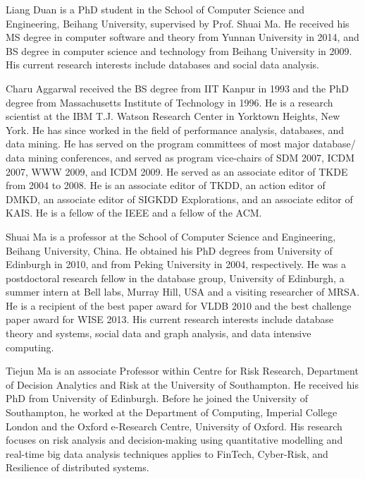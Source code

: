 \vspace{-8ex}
\begin{IEEEbiography}{Liang Duan} is a PhD student in the School of Computer Science and Engineering, Beihang University, supervised by Prof. Shuai Ma. He received his MS degree in computer software and theory from Yunnan University in 2014, and BS degree in computer science and technology from Beihang University in 2009. His current research interests include databases and social data analysis.
\end{IEEEbiography}
\vspace{-8ex}
\begin{IEEEbiography}{Charu Aggarwal} received the BS degree
from IIT Kanpur in 1993 and the PhD degree
from Massachusetts Institute of Technology in
1996. He is a research scientist at the IBM T.J.
Watson Research Center in Yorktown Heights,
New York. He has since worked in the field of
performance analysis, databases, and data mining.
He has served on the
program committees of most major database/
data mining conferences, and served as program vice-chairs of SDM 2007, ICDM 2007, WWW 2009, and ICDM
2009. He served as an associate editor of TKDE from 2004 to 2008. He is an
associate editor of TKDD, an action editor of DMKD, an associate editor of SIGKDD Explorations, and an associate editor of KAIS. He is a fellow of the IEEE and a fellow of the ACM.
\end{IEEEbiography}
\vspace{-8ex}
\begin{IEEEbiography}{Shuai Ma} is a professor at the School of Computer Science and Engineering, Beihang University, China.
He obtained his PhD degrees from University of Edinburgh in 2010, and from
Peking University in 2004, respectively.
He was a postdoctoral research fellow in the database group, University of Edinburgh, a summer intern at Bell labs, Murray Hill, USA and a visiting researcher of MRSA.
He is a recipient of the best paper award for VLDB 2010 and the best challenge paper award for WISE 2013. His current research interests include database theory and systems, social data and graph analysis, and data intensive computing.
\end{IEEEbiography}
\vspace{-8ex}
\begin{IEEEbiography}{Tiejun Ma} is an associate Professor within Centre for Risk Research, Department of Decision Analytics and Risk at the University of Southampton. He received his PhD from University of Edinburgh. Before he joined the University of Southampton, he worked at the Department of Computing, Imperial College London and the Oxford e-Research Centre, University of Oxford. His research focuses on risk analysis and decision-making using quantitative modelling and real-time big data analysis techniques applies to FinTech, Cyber-Risk, and Resilience of distributed systems.
\end{IEEEbiography}
